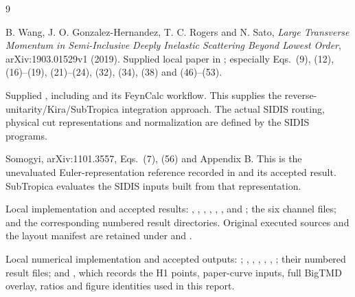 \documentclass[11pt,a4paper]{article}
\begin{document}
\begin{thebibliography}{9}
\raggedright

B. Wang, J. O. Gonzalez-Hernandez, T. C. Rogers and N. Sato,
\emph{Large Transverse Momentum in Semi-Inclusive Deeply Inelastic
Scattering Beyond Lowest Order}, arXiv:1903.01529v1 (2019).
Supplied local paper in ; especially Eqs.~(9), (12),
(16)--(19), (21)--(24), (32), (34), (38) and (46)--(53).

Supplied ,
including  and its FeynCalc workflow.
This supplies the reverse-unitarity/Kira/SubTropica integration approach.
The actual SIDIS routing, physical cut representations and normalization
are defined by the SIDIS programs.

Somogyi, arXiv:1101.3557, Eqs.~(7), (56) and Appendix B.
This is the unevaluated Euler-representation reference recorded in
 and its accepted result.
SubTropica evaluates the SIDIS inputs built from that representation.

Local implementation and accepted results:
,
,
,
,
,
,
 and
;
the six channel  files; and the corresponding numbered
result directories. Original executed sources and the layout manifest
are retained under  and
.

Local numerical implementation and accepted outputs:
;
,
,
,
,
,
;
their numbered result files; and
,
which records the H1 points, paper-curve inputs, full BigTMD overlay,
ratios and figure identities used in this report.

\end{thebibliography}
\end{document}
